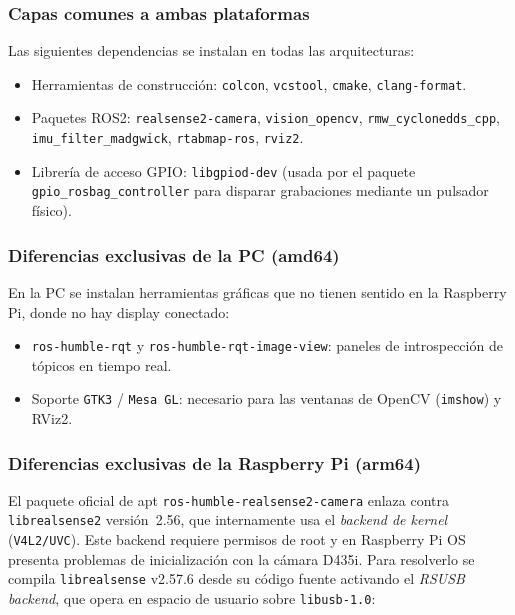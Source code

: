 \subsubsection{Capas comunes a ambas plataformas}

Las siguientes dependencias se instalan en todas las arquitecturas:

\begin{itemize}
  \item Herramientas de construcción: \texttt{colcon}, \texttt{vcstool},
        \texttt{cmake}, \texttt{clang-format}.
  \item Paquetes ROS2: \texttt{realsense2-camera},
        \texttt{vision\_opencv}, \texttt{rmw\_cyclonedds\_cpp},
        \texttt{imu\_filter\_madgwick}, \texttt{rtabmap-ros},
        \texttt{rviz2}.
  \item Librería de acceso GPIO: \texttt{libgpiod-dev} (usada por el
        paquete \texttt{gpio\_rosbag\_controller} para disparar grabaciones
        mediante un pulsador físico).
\end{itemize}

\subsubsection{Diferencias exclusivas de la PC (amd64)}

En la PC se instalan herramientas gráficas que no tienen sentido en la
Raspberry Pi, donde no hay display conectado:

\begin{itemize}
  \item \texttt{ros-humble-rqt} y \texttt{ros-humble-rqt-image-view}:
        paneles de introspección de tópicos en tiempo real.
  \item Soporte \texttt{GTK3} / \texttt{Mesa GL}: necesario para las
        ventanas de OpenCV (\texttt{imshow}) y RViz2.
\end{itemize}

\subsubsection{Diferencias exclusivas de la Raspberry Pi (arm64)}

El paquete oficial de apt \texttt{ros-humble-realsense2-camera} enlaza
contra \texttt{librealsense2} versión~2.56, que internamente usa el
\emph{backend de kernel} (\texttt{V4L2/UVC}). Este backend requiere
permisos de root y en Raspberry Pi OS presenta problemas de inicialización
con la cámara D435i. Para resolverlo se compila \texttt{librealsense}
v2.57.6 desde su código fuente activando el \emph{RSUSB backend}, que
opera en espacio de usuario sobre \texttt{libusb-1.0}:

